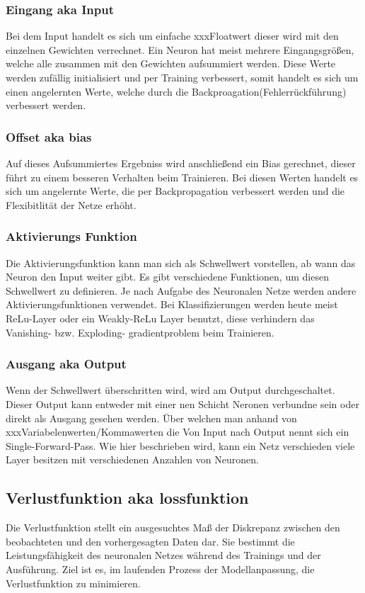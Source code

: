 \subsubsection{Eingang aka Input}
Bei dem Input handelt es sich um einfache xxxFloatwert dieser wird mit den einzelnen Gewichten verrechnet. Ein Neuron hat meist mehrere Eingangsgrößen, welche alle zusammen mit den Gewichten aufsummiert werden. Diese Werte werden zufällig initialisiert und per Training verbessert, somit handelt es sich um einen angelernten Werte, welche durch die Backproagation(Fehlerrückführung) verbessert werden.

\subsubsection{Offset aka bias}
Auf dieses Aufsummiertes Ergebniss wird anschließend ein Bias gerechnet, dieser führt zu einem besseren Verhalten beim Trainieren. Bei diesen Werten handelt es sich um angelernte Werte, die per Backpropagation verbessert werden und die Flexibitlität der Netze erhöht.


\subsubsection{Aktivierungs Funktion}
Die Aktivierungsfunktion kann man sich als Schwellwert vorstellen, ab wann das Neuron den Input weiter gibt. Es gibt verschiedene Funktionen, um diesen Schwellwert zu definieren. Je nach Aufgabe des Neuronalen Netze werden andere Aktivierungsfunktionen verwendet. Bei Klassifizierungen werden heute meist ReLu-Layer oder ein Weakly-ReLu Layer benutzt, diese verhindern das Vanishing- bzw. Exploding- gradientproblem beim Trainieren.

\subsubsection{Ausgang aka Output}
Wenn der Schwellwert überschritten wird, wird am Output durchgeschaltet. Dieser Output kann entweder mit einer nen Schicht Neronen verbundne sein oder direkt als Ausgang gesehen werden. Über welchen man anhand von xxxVariabelenwerten/Kommawerten die 
Von Input nach Output nennt sich ein Single-Forward-Pass. Wie hier beschrieben wird, kann ein Netz verschieden viele Layer besitzen mit verschiedenen Anzahlen von Neuronen.

\subsection{Verlustfunktion aka lossfunktion}
Die Verlustfunktion stellt ein ausgesuchtes Maß der Diskrepanz zwischen den beobachteten und den vorhergesagten Daten dar. Sie bestimmt die Leistungsfähigkeit des neuronalen Netzes während des Trainings und der Ausführung. Ziel ist es, im laufenden Prozess der Modellanpassung, die Verlustfunktion zu minimieren.

